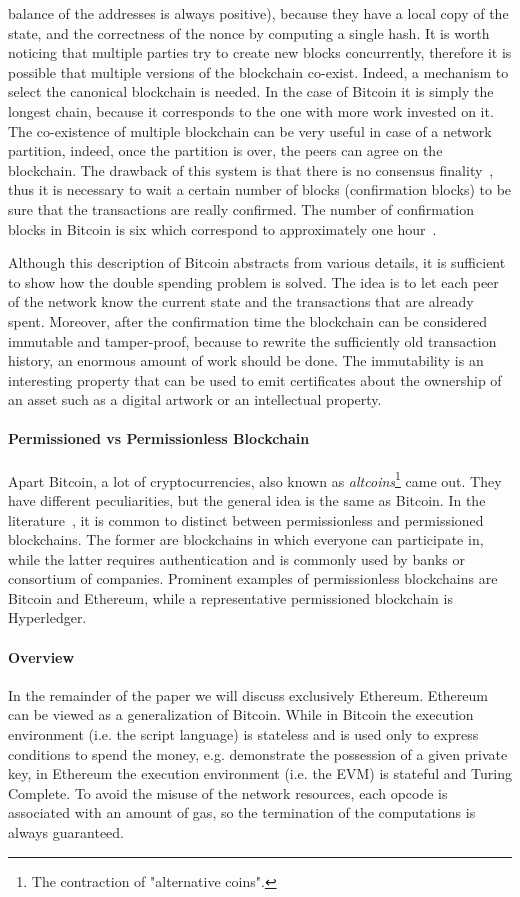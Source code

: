balance of the addresses is always positive), because they have a local copy of
the state, and the correctness of the nonce by computing a single hash. It is
worth noticing that multiple parties try to create new blocks concurrently,
therefore it is possible that multiple versions of the blockchain co-exist.
Indeed, a mechanism to select the canonical blockchain is needed. In the case of
Bitcoin it is simply the longest chain, because it corresponds to the one with
more work invested on it. The co-existence of multiple blockchain can be very
useful in case of a network partition, indeed, once the partition is over, the
peers can agree on the blockchain. The drawback of this system is that there is
no consensus finality~\cite{bib:the-quest}, thus it is necessary to wait a
certain number of blocks (confirmation blocks) to be sure that the transactions
are really confirmed. The number of confirmation blocks in Bitcoin is six which
correspond to approximately one hour~\cite{bib:masteringbitcoin}.

Although this description of Bitcoin abstracts from various details, it is
sufficient to show how the double spending problem is solved. The idea is to let
each peer of the network know the current state and the transactions that are
already spent. Moreover, after the confirmation time the blockchain can be
considered immutable and tamper-proof, because to rewrite the sufficiently old
transaction history, an enormous amount of work should be done. The immutability
is an interesting property that can be used to emit certificates about the
ownership of an asset such as a digital artwork or an intellectual property.

\paragraph{Permissioned vs Permissionless Blockchain}
Apart Bitcoin, a lot of cryptocurrencies, also known as
\emph{altcoins}\footnote{The contraction of "alternative coins".} came out.
They have different peculiarities, but the general idea is the same as Bitcoin.
In the literature~\cite{bib:the-quest}, it is common to distinct between
permissionless and permissioned blockchains. The former are blockchains in which
everyone can participate in, while the latter requires authentication and is
commonly used by banks or consortium of companies. Prominent examples of
permissionless blockchains are Bitcoin and Ethereum, while a representative
permissioned blockchain is Hyperledger.

\paragraph{Overview}
In the remainder of the paper we will discuss exclusively Ethereum. Ethereum can
be viewed as a generalization of Bitcoin. While in Bitcoin the execution
environment (i.e. the script language) is stateless and is used only to express
conditions to spend the money, e.g. demonstrate the possession of a given
private key, in Ethereum the execution environment (i.e. the EVM) is stateful
and Turing Complete. To avoid the misuse of the network resources, each opcode
is associated with an amount of gas, so the termination of the computations is
always guaranteed.


